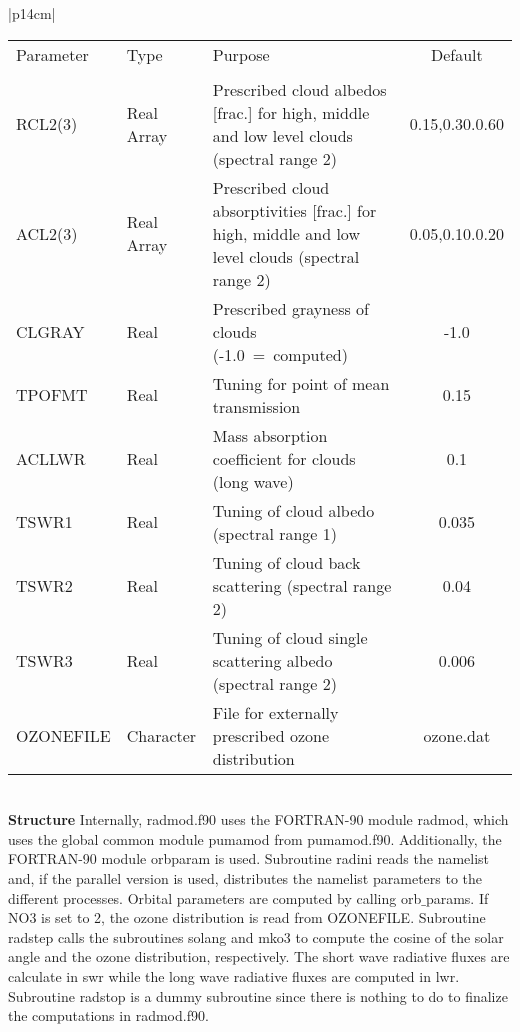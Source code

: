 \begin{center}
\begin{tabular}{|p{14cm}|}
\begin{center}
\begin{tabular}{l l p{5cm} c} %
Parameter & Type & Purpose & Default \\
&&&\\
RCL2(3) & Real Array & Prescribed cloud albedos [frac.] for high, middle and low level
clouds
(spectral range 2) &0.15,0.30.0.60 \\
ACL2(3) & Real Array & Prescribed cloud absorptivities [frac.] for high, middle and low
level
clouds (spectral range 2) &0.05,0.10.0.20 \\
CLGRAY & Real & Prescribed grayness of clouds (-1.0~=~computed) & -1.0 \\
TPOFMT& Real & Tuning for point of mean transmission & 0.15 \\
ACLLWR& Real & Mass absorption coefficient for clouds (long wave) & 0.1 \\
TSWR1 & Real & Tuning of cloud albedo (spectral range 1) & 0.035 \\
TSWR2 & Real & Tuning of cloud back scattering (spectral range 2) & 0.04 \\
TSWR3 & Real & Tuning of cloud single scattering albedo (spectral range 2) & 0.006 \\
OZONEFILE& Character & File for externally prescribed ozone distribution & ozone.dat \\
\end{tabular} 
\end{center}
\vspace{3mm} \\
\hline
\vspace{2mm} {\bf Structure} Internally, {\module radmod.f90} uses the FORTRAN-90
module {\modu radmod}, which uses the global common module {\modu pumamod} from
{\module pumamod.f90}. Additionally,  the  FORTRAN-90
module {\modu orbparam} is used. Subroutine {\sub radini} reads the namelist and, if the
parallel version is used,  distributes the namelist parameters to the different processes. 
Orbital parameters are computed by calling {\sub orb$\_$params}. If NO3 is set to 2, the
ozone
distribution is read from {\file OZONEFILE}. Subroutine {\sub radstep} calls the subroutines
{\sub solang} and {\sub mko3} to compute the cosine of the solar angle and the ozone
distribution, respectively. The short wave radiative fluxes are calculate in {\sub swr} while
the
long wave radiative fluxes are computed in {\sub lwr}. Subroutine {\sub radstop} is a dummy
subroutine since there is nothing to do to finalize the computations in {\module radmod.f90}.
\vspace{3mm} \\
\hline
\end{tabular}
\end{center}
\newpage

